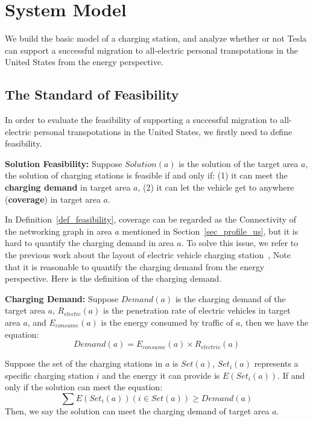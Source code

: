 \section{System Model}
\label{sec_basic_model}

We build the basic model of a charging station,
and analyze whether or not Tesla can support a successful migration to all-electric personal transpotations in the United States from the energy perspective.

\subsection{The Standard of Feasibility}
\label{subsec_standard_feasibility}
In order to evaluate the feasibility of supporting a successful migration to all-electric personal transpotations in the United States,
we firstly need to define feasibility.
\begin{definition}
\textbf{Solution Feasibility:}
\label{def_feasibility}
Suppose $Solution(a)$ is the solution of the target area $a$,
the solution of charging stations is feasible if and only if:
(1) it can meet the \textbf{charging demand} in target area $a$,
(2) it can let the vehicle get to anywhere (\textbf{coverage}) in target area $a$.
\end{definition}
In Definition~\ref{def_feasibility}, coverage can be regarded as the Connectivity of the networking graph in area $a$ mentioned in Section~\ref{sec_profile_us},
but it is hard to quantify the charging demand in area $a$.
To solve this issue,
we refer to the previous work about the layout of electric vehicle charging station~\cite{wang2010novel},
Note that it is reasonable to quantify the charging demand from the energy perspective.
Here is the definition of the charging demand.
\begin{definition}
\textbf{Charging Demand:}
\label{def_charging_demand}
Suppose $Demand(a)$ is the charging demand of the target area $a$,
$R_{electic}(a)$ is the penetration rate of electric vehicles in target area $a$,
and $E_{consume}(a)$ is the energy consumed by traffic of $a$,
then we have the equation:
\begin{equation}
\label{equ_demand}
Demand(a) = E_{consume}(a) \times R_{electric}(a)
\end{equation}
\end{definition}
Suppose the set of the charging stations in $a$ is $Set(a)$,
$Set_i(a)$ represents a specific charging station $i$ and the energy it can provide is $E(Set_i(a))$.
If and only if the solution can meet the equation:
\begin{equation}
\label{equ_energy}
\sum{E(Set_i(a))} (i \in Set(a)) \geqslant Demand(a)
\end{equation}
Then, we say the solution can meet the charging demand of target area $a$.

